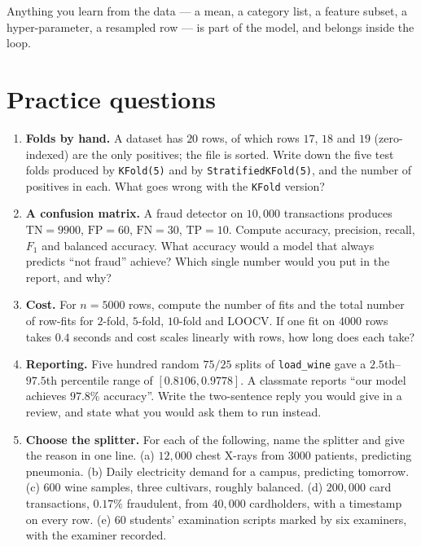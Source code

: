\documentclass[11pt]{article}
\begin{document}
\begin{keyidea}
Anything you learn from the data --- a mean, a category list, a feature
subset, a hyper-parameter, a resampled row --- is part of the model, and
belongs inside the loop.
\end{keyidea}

\section{Practice questions}
\label{sec:questions}

\begin{enumerate}[leftmargin=*]
  \item \textbf{Folds by hand.} A dataset has $20$ rows, of which rows $17$,
    $18$ and $19$ (zero-indexed) are the only positives; the file is sorted.
    Write down the five test folds produced by \texttt{KFold(5)} and by
    \texttt{StratifiedKFold(5)}, and the number of positives in each. What
    goes wrong with the \texttt{KFold} version?

  \item \textbf{A confusion matrix.} A fraud detector on $10{,}000$
    transactions produces $\mathrm{TN} = 9900$, $\mathrm{FP} = 60$,
    $\mathrm{FN} = 30$, $\mathrm{TP} = 10$. Compute accuracy, precision,
    recall, $F_1$ and balanced accuracy. What accuracy would a model that
    always predicts ``not fraud'' achieve? Which single number would you put
    in the report, and why?

  \item \textbf{Cost.} For $n = 5000$ rows, compute the number of fits and the
    total number of row-fits for $2$-fold, $5$-fold, $10$-fold and LOOCV. If
    one fit on $4000$ rows takes $0.4$ seconds and cost scales linearly with
    rows, how long does each take?

  \item \textbf{Reporting.} Five hundred random $75/25$ splits of
    \texttt{load\_wine} gave a $2.5$th--$97.5$th percentile range of
    $[0.8106, 0.9778]$. A classmate reports ``our model achieves $97.8\%$
    accuracy''. Write the two-sentence reply you would give in a review, and
    state what you would ask them to run instead.

  \item \textbf{Choose the splitter.} For each of the following, name the
    splitter and give the reason in one line. (a) $12{,}000$ chest X-rays from
    $3000$ patients, predicting pneumonia. (b) Daily electricity demand for a
    campus, predicting tomorrow. (c) $600$ wine samples, three cultivars,
    roughly balanced. (d) $200{,}000$ card transactions, $0.17\%$ fraudulent,
    from $40{,}000$ cardholders, with a timestamp on every row. (e) $60$
    students' examination scripts marked by six examiners, with the examiner
    recorded.


\end{enumerate}
\end{document}
